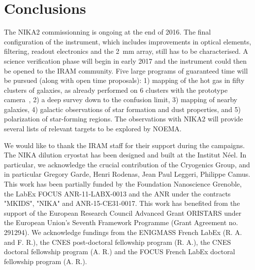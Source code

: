 \documentclass{sf2a-conf2016}
\begin{document}

\section{Conclusions}

The NIKA2 commissionning is ongoing at the end of 2016. The final
configuration of the instrument, which includes improvements in optical
elements, filtering, readout electronics and the 2~mm array, still has to be
characterised. A science verification phase will begin in early 2017 and the
instrument could then be opened to the IRAM community. Five large programs of
guaranteed time will be pursued (along with open time proposals): 1) mapping
of the hot gas in fifty clusters of galaxies, as already performed on 6
clusters with the prototype
camera~\citep{adam2014,adam2015,adam2016,2016arXiv160707679R}, 2) a deep
survey down to the confusion limit, 3) mapping of nearby galaxies, 4) galactic
observations of star formation and dust properties, and 5) polarization of
star-forming regions. The observations with NIKA2 will provide several lists
of relevant targets to be explored by NOEMA.


\begin{acknowledgements}
  We would like to thank the IRAM staff for their support during the
  campaigns.  The NIKA dilution cryostat has been designed and built at the
  Institut N\'eel.  In particular, we acknowledge the crucial contribution of
  the Cryogenics Group, and in particular Gregory Garde, Henri Rodenas, Jean
  Paul Leggeri, Philippe Camus.  This work has been partially funded by the
  Foundation Nanoscience Grenoble, the LabEx FOCUS ANR-11-LABX-0013 and the
  ANR under the contracts "MKIDS", "NIKA" and ANR-15-CE31-0017.  This work has
  benefited from the support of the European Research Council Advanced Grant
  ORISTARS under the European Union's Seventh Framework Programme (Grant
  Agreement no. 291294).  We acknowledge fundings from the ENIGMASS French
  LabEx (R. A. and F. R.), the CNES post-doctoral fellowship program (R. A.),
  the CNES doctoral fellowship program (A. R.) and the FOCUS French LabEx
  doctoral fellowship program (A. R.).
\end{acknowledgements}
\end{document}
